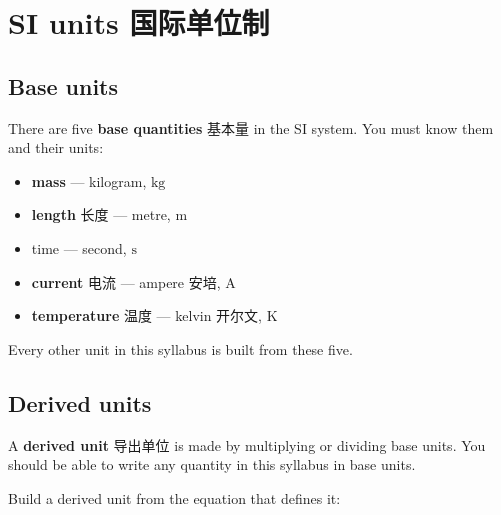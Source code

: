 \documentclass[11pt]{article}
\begin{document}
\section*{SI units 国际单位制}

\subsection*{Base units}

There are five \textbf{base quantities} 基本量 in the SI system. You must know them and their units:

\begin{itemize}
\item \textbf{mass} — kilogram, $\text{kg}$

\item \textbf{length} 长度 — metre, $\text{m}$

\item time — second, $\text{s}$

\item \textbf{current} 电流 — ampere 安培, $\text{A}$

\item \textbf{temperature} 温度 — kelvin 开尔文, $\text{K}$

\end{itemize}

Every other unit in this syllabus is built from these five.

\subsection*{Derived units}

A \textbf{derived unit} 导出单位 is made by multiplying or dividing base units. You should be able to write any quantity in this syllabus in base units.

Build a derived unit from the equation that defines it:
\end{document}
